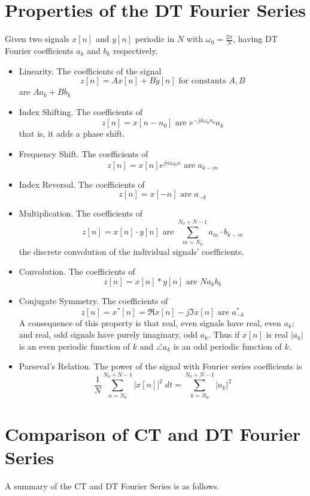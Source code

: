 \section{Properties of the DT Fourier Series}

Given two signals $x[n]$ and $y[n]$ periodic in $N$ with $\omega_0 = \frac{2\pi}{N}$, having DT Fourier coefficients
$a_k$ and $b_k$ respectively.

\begin{itemize}
\item Linearity. The coefficients of the signal
  \[
  z[n] = Ax[n] + By[n] \mbox{ for constants } A,B 
  \]
  are $Aa_k + Bb_k$
\item Index Shifting. The coefficients of
  \[
  z[n] = x[n-n_0] \mbox{ are } e^{-jk\omega_0 n_0}a_k
  \]
  that is, it adds a phase shift.
\item Frequency Shift. The coefficients of
  \[
  z[n] = x[n]e^{jm\omega_0n} \mbox{ are } a_{k-m}
  \]
\item Index Reversal. The coefficients of
  \[
  z[n] = x[-n] \mbox{ are } a_{-k}
  \]
\item Multiplication. The coefficients of
  \[
  z[n] = x[n] \cdot y[n] \mbox{ are } \sum\limits_{m = N_0}^{N_0 + N -1} a_m\cdot b_{k-m}
  \]
  the discrete convolution of the individual signals' coefficients.
\item Convolution. The coefficients of
  \[
  z[n] = x[n] * y[n] \mbox{ are } N a_k b_k
  \] 
\item Conjugate Symmetry. The coefficients of
  \[
  z[n] = x^*[n] = \Re{x[n]} - j\Im{x[n]} \mbox{ are } a_{-k}^*
  \]
  A consequence of this property is that real, even signals have real, even $a_k$; and real, odd signals have purely imaginary, odd  $a_k$. Thus if $x[n]$ is real  $|a_k|$ is an even periodic function of $k$ and $\angle a_k$ is an odd periodic function of $k$. 
\item Parseval's Relation. The power of the signal with Fourier series coefficients is
  \[
  \frac{1}{N} \sum\limits_{n = N_0}^{N_0 + N -1} |x[n]|^2\;dt = \sum\limits_{k = N_0}^{N_0+N-1} |a_k|^2
  \]
\end{itemize}


\section{Comparison of CT and DT Fourier Series}
A summary of the CT and DT Fourier Series is as follows.\\

